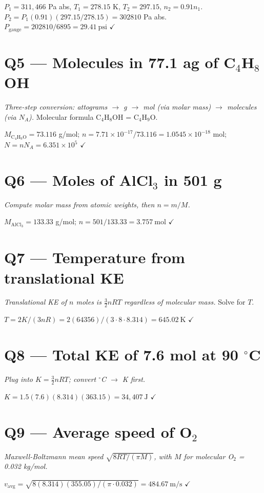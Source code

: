 \documentclass[11pt]{article}
\newcommand{\checkmk}{\ensuremath{\checkmark}}
\begin{document}
$P_1 = 311{,}466$ Pa abs, $T_1 = 278.15$ K, $T_2 = 297.15$, $n_2 = 0.91n_1$.
$P_2 = P_1(0.91)(297.15/278.15) = 302810$ Pa abs.
$P_{\text{gauge}} = 202810/6895 = \boxed{29.41\ \text{psi}}$ \checkmk

\section*{Q5 --- Molecules in 77.1 ag of C$_4$H$_8$OH}
\emph{Three-step conversion: attograms $\to$ g $\to$ mol (via molar mass) $\to$ molecules (via $N_A$).} Molecular formula C$_4$H$_8$OH = C$_4$H$_9$O.

$M_{\text{C}_4\text{H}_9\text{O}} = 73.116$ g/mol; $n = 7.71\times10^{-17}/73.116 = 1.0545\times10^{-18}$ mol; $N = nN_A = \boxed{6.351\times10^5}$ \checkmk

\section*{Q6 --- Moles of AlCl$_3$ in 501 g}
\emph{Compute molar mass from atomic weights, then $n=m/M$.}

$M_{\text{AlCl}_3} = 133.33$ g/mol; $n = 501/133.33 = \boxed{3.757\ \text{mol}}$ \checkmk

\section*{Q7 --- Temperature from translational KE}
\emph{Translational KE of $n$ moles is $\tfrac32 nRT$ regardless of molecular mass.} Solve for $T$.

$T = 2K/(3nR) = 2(64356)/(3\cdot 8\cdot 8.314) = \boxed{645.02\ \text{K}}$ \checkmk

\section*{Q8 --- Total KE of 7.6 mol at 90 $^\circ$C}
\emph{Plug into $K=\tfrac32 nRT$; convert $^\circ$C $\to$ K first.}

$K = 1.5(7.6)(8.314)(363.15) = \boxed{34{,}407\ \text{J}}$ \checkmk

\section*{Q9 --- Average speed of O$_2$}
\emph{Maxwell-Boltzmann mean speed $\sqrt{8RT/(\pi M)}$, with $M$ for \emph{molecular} O$_2$ = 0.032 kg/mol.}

$v_{\text{avg}} = \sqrt{8(8.314)(355.05)/(\pi\cdot 0.032)} = \boxed{484.67\ \text{m/s}}$ \checkmk
\end{document}
